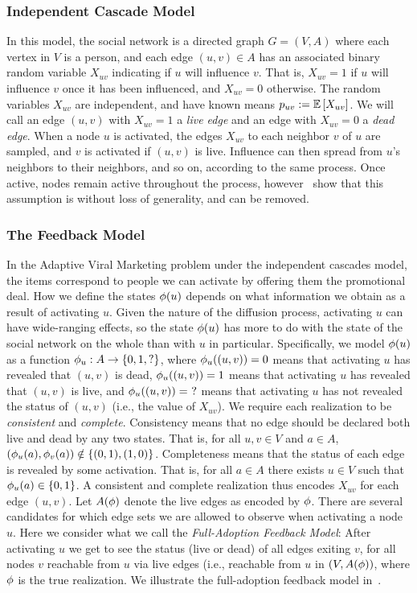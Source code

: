 \subsubsection{Independent Cascade Model}
In this model, the social network is a directed graph $G = (V, A)$
where each vertex in $V$ is a person, and each edge $(u, v)\in A$ has an
associated binary random variable $X_{uv}$ indicating if $u$ will
influence $v$.  That is, 
$X_{uv} = 1$ if $u$ will influence
$v$ once it has been influenced, and $X_{uv} = 0$ otherwise.
The random variables $X_{uv}$ are independent, and have known means 
$p_{uv} := \mathbb{E}\left[X_{uv}\right]$.
We will call an edge $(u,v)$ with $X_{uv} = 1$ a \emph{live edge} and
an edge with $X_{uv} = 0$ a \emph{dead edge}. 
When a node $u$ is activated, the edges $X_{uv}$ to each neighbor $v$
of $u$ are sampled, and $v$ is activated if $(u,v)$ is live.
%
Influence can then spread from $u$'s neighbors to their neighbors, and so on,
according to the same process.  Once active, nodes remain active
throughout the process, however~\citet{kempe03} show that this
assumption is without loss of generality, and can be removed.

\subsubsection{The Feedback Model}
In the Adaptive Viral Marketing problem under the 
independent cascades model, the items correspond to people we can 
activate by offering them the promotional deal.  How we define the
states ${\color{black}{\ensuremath{\phi}}}(u)$ depends on what information we obtain as a result
of activating $u$.  Given the nature of the diffusion process,
activating $u$ can have wide-ranging effects, so the state 
${\color{black}{\ensuremath{\phi}}}(u)$ has more to do with the state of the social network on the
whole than with $u$ in particular.  
%
%
%
Specifically, we model 
${\color{black}{\ensuremath{\phi}}}(u)$ as a function ${\color{black}{\ensuremath{\phi}}}_u:A \to \left\{0,1,?\right\}$, where 
${\color{black}{\ensuremath{\phi}}}_u((u, v)) = 0$ means that activating $u$ has revealed that $(u,v)$ is dead, 
${\color{black}{\ensuremath{\phi}}}_u((u, v)) = 1$ means that activating $u$ has revealed that $(u,v)$ is live, and 
${\color{black}{\ensuremath{\phi}}}_u((u, v)) =\ ?$ means that activating $u$ has not revealed the
status of $(u,v)$ (i.e., the value of $X_{uv}$).  We require each
realization to be \emph{consistent} and \emph{complete}.
Consistency means that no edge should be declared both live and dead
by any two states.  That is, for all 
$u, v \in V$ and $a \in A$, $({\color{black}{\ensuremath{\phi}}}_u(a),{\color{black}{\ensuremath{\phi}}}_v(a)) \notin \left\{(0,1), (1,0)\right\}$.
Completeness means that the status of each edge is revealed by some
activation.  That is, for all 
$a \in A$ there exists $u \in V$ such that ${\color{black}{\ensuremath{\phi}}}_u(a) \in \left\{0,1\right\}$.
A consistent and complete realization thus encodes $X_{uv}$ for each
edge $(u,v)$.  Let ${A({{\color{black}{\ensuremath{\phi}}}})}$ denote the live edges as encoded by
${\color{black}{\ensuremath{\phi}}}$.  
There are several candidates for which edge sets we
are allowed to observe when activating a node $u$.
Here we consider what we call the \emph{Full-Adoption Feedback Model}: 
After activating $u$ we get to
  see the status (live or dead) of all edges exiting $v$, for all  
  nodes $v$ reachable from $u$ via live edges (i.e., reachable from
  $u$ in $(V, {A({{\color{black}{\ensuremath{\phi}}}})})$, where ${\color{black}{\ensuremath{\phi}}}$ is the true realization. 
We illustrate the full-adoption feedback model in~.

